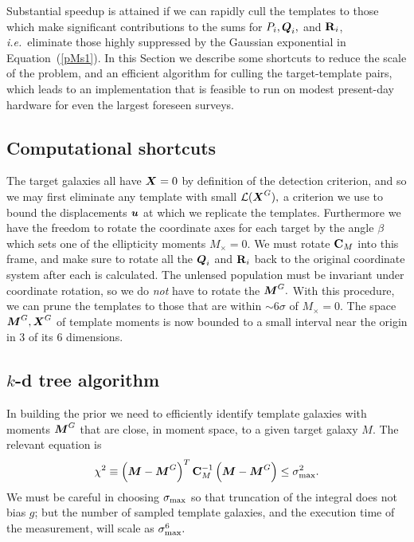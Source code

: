 \documentclass[11pt,preprint,flushrt]{aastex}
\def\eqq#1{Equation~(\ref{#1})}
\newcommand\ie{{\it i.e.\/}}
\newcommand{\vecX}{\mbox{\boldmath $X$}}
\newcommand{\vecg}{\mbox{\boldmath $g$}}
\newcommand{\vecM}{\mbox{\boldmath $M$}}
\newcommand{\vecQ}{\mbox{\boldmath $Q$}}
\newcommand{\vecu}{\mbox{\boldmath $u$}}
\newcommand{\matR}{\mbox{$\bf R$}}
\newcommand{\matC}{\mbox{$\bf C$}}
\newcommand{\likeli}{\mbox{$\mathcal{L}$}}
\begin{document}
Substantial speedup is attained if we can rapidly cull the templates
to those which make significant contributions to the sums for $P_i,
\vecQ_i,$ and $\matR_i$, \ie\ eliminate those highly suppressed by the
Gaussian exponential in \eqq{pMs1}. In this Section we describe some
shortcuts to reduce the scale of the problem, and
an efficient algorithm for culling the target-template pairs, which
leads to an implementation that is feasible to run on modest
present-day hardware for even the largest foreseen surveys.

\subsection{Computational shortcuts}
The target galaxies all have $\vecX=0$ by definition of the detection
criterion, and so we may first eliminate any template with
small $\likeli(\vecX^G),$ a criterion we use to bound the
displacements $\vecu$ at which we replicate the templates.
Furthermore we have the freedom to rotate the coordinate axes for
each target by the
angle $\beta$ which sets one of the ellipticity moments $M_\times=0$.
We must rotate $\matC_M$ into this frame, and make sure to rotate all
the $\vecQ_i$ and $\matR_i$ back to the original coordinate system after
each is calculated.  The unlensed population must be invariant under coordinate
rotation, so we do \emph{not} have to rotate the $\vecM^G.$
With this procedure, we can prune the
templates to those that are within $\sim 6\sigma$ of $M_\times=0.$
The space ${\vecM^G,\vecX^G}$ of template moments is
now bounded to a small interval near the origin in 3 of its 6 dimensions.


\subsection{$k$-d tree algorithm}
\label{kdtree}
In building the prior we need to efficiently identify template
galaxies with moments $\vecM^G$ that
are close, in moment space, to a given target
galaxy \vecM.  The relevant equation is
\begin{equation}
\label{chisq}
\chi^2 \equiv \left(\vecM-\vecM^G\right)^T \matC_M^{-1}
\left(\vecM-\vecM^G\right) \le \sigma_{\rm max}^2.
\end{equation}
We must be careful in choosing $\sigma_{\rm max}$ so that 
truncation of the integral does not bias \vecg; but the number of
sampled template galaxies, and the execution time of the measurement,
will scale as $\sigma_{\rm max}^6.$
\end{document}
